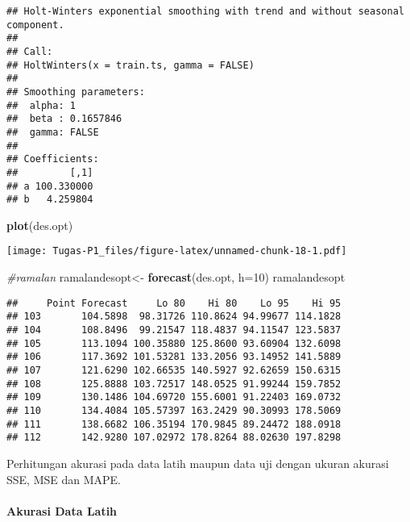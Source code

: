 \documentclass[
]{article}
\newenvironment{Shaded}{\begin{snugshade}}{\end{snugshade}}
\newcommand{\AttributeTok}[1]{\textcolor[rgb]{0.13,0.29,0.53}{#1}}
\newcommand{\CommentTok}[1]{\textcolor[rgb]{0.56,0.35,0.01}{\textit{#1}}}
\newcommand{\DecValTok}[1]{\textcolor[rgb]{0.00,0.00,0.81}{#1}}
\newcommand{\FloatTok}[1]{\textcolor[rgb]{0.00,0.00,0.81}{#1}}
\newcommand{\FunctionTok}[1]{\textcolor[rgb]{0.13,0.29,0.53}{\textbf{#1}}}
\newcommand{\NormalTok}[1]{#1}
\newcommand{\OtherTok}[1]{\textcolor[rgb]{0.56,0.35,0.01}{#1}}
\newcommand{\SpecialCharTok}[1]{\textcolor[rgb]{0.81,0.36,0.00}{\textbf{#1}}}
\begin{document}
\begin{verbatim}
## Holt-Winters exponential smoothing with trend and without seasonal component.
## 
## Call:
## HoltWinters(x = train.ts, gamma = FALSE)
## 
## Smoothing parameters:
##  alpha: 1
##  beta : 0.1657846
##  gamma: FALSE
## 
## Coefficients:
##         [,1]
## a 100.330000
## b   4.259804
\end{verbatim}

\begin{Shaded}
\begin{Highlighting}[]
\FunctionTok{plot}\NormalTok{(des.opt)}
\end{Highlighting}
\end{Shaded}

\texttt{[image: Tugas-P1\_files/figure-latex/unnamed-chunk-18-1.pdf]}

\begin{Shaded}
\begin{Highlighting}[]
\CommentTok{\#ramalan}
\NormalTok{ramalandesopt}\OtherTok{\textless{}{-}} \FunctionTok{forecast}\NormalTok{(des.opt, }\AttributeTok{h=}\DecValTok{10}\NormalTok{)}
\NormalTok{ramalandesopt}
\end{Highlighting}
\end{Shaded}

\begin{verbatim}
##     Point Forecast     Lo 80    Hi 80    Lo 95    Hi 95
## 103       104.5898  98.31726 110.8624 94.99677 114.1828
## 104       108.8496  99.21547 118.4837 94.11547 123.5837
## 105       113.1094 100.35880 125.8600 93.60904 132.6098
## 106       117.3692 101.53281 133.2056 93.14952 141.5889
## 107       121.6290 102.66535 140.5927 92.62659 150.6315
## 108       125.8888 103.72517 148.0525 91.99244 159.7852
## 109       130.1486 104.69720 155.6001 91.22403 169.0732
## 110       134.4084 105.57397 163.2429 90.30993 178.5069
## 111       138.6682 106.35194 170.9845 89.24472 188.0918
## 112       142.9280 107.02972 178.8264 88.02630 197.8298
\end{verbatim}

Perhitungan akurasi pada data latih maupun data uji dengan ukuran
akurasi SSE, MSE dan MAPE.

\hypertarget{akurasi-data-latih}{%
\paragraph{Akurasi Data Latih}\label{akurasi-data-latih}}

\begin{Shaded}
\end{Shaded}
\end{document}
